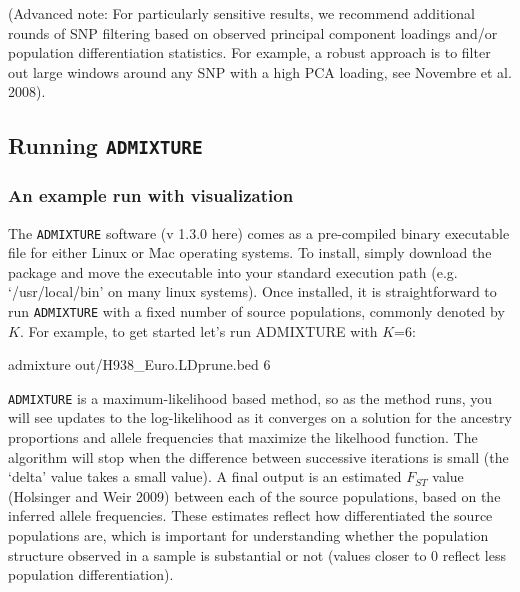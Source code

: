 \documentclass[smallextended]{svjour3}       %
\newenvironment{Shaded}{\begin{snugshade}}{\end{snugshade}}
\newcommand{\ExtensionTok}[1]{#1}
\newcommand{\NormalTok}[1]{#1}
\begin{document}
(Advanced note: For particularly sensitive results, we recommend
additional rounds of SNP filtering based on observed principal component
loadings and/or population differentiation statistics. For example, a
robust approach is to filter out large windows around any SNP with a
high PCA loading, see Novembre et al. 2008).

\subsection{\texorpdfstring{Running
\texttt{ADMIXTURE}}{Running ADMIXTURE}}\label{running-admixture}

\subsubsection{An example run with
visualization}\label{an-example-run-with-visualization}

The \texttt{ADMIXTURE} software (v 1.3.0 here) comes as a pre-compiled
binary executable file for either Linux or Mac operating systems. To
install, simply download the package and move the executable into your
standard execution path (e.g. `/usr/local/bin' on many linux systems).
Once installed, it is straightforward to run \texttt{ADMIXTURE} with a
fixed number of source populations, commonly denoted by \(K\). For
example, to get started let's run ADMIXTURE with \(K\)=6:

\begin{Shaded}
\begin{Highlighting}[]
\ExtensionTok{admixture}\NormalTok{ out/H938_Euro.LDprune.bed 6}
\end{Highlighting}
\end{Shaded}

\texttt{ADMIXTURE} is a maximum-likelihood based method, so as the
method runs, you will see updates to the log-likelihood as it converges
on a solution for the ancestry proportions and allele frequencies that
maximize the likelhood function. The algorithm will stop when the
difference between successive iterations is small (the `delta' value
takes a small value). A final output is an estimated \(F_{ST}\) value
(Holsinger and Weir 2009) between each of the source populations, based
on the inferred allele frequencies. These estimates reflect how
differentiated the source populations are, which is important for
understanding whether the population structure observed in a sample is
substantial or not (values closer to 0 reflect less population
differentiation).
\end{document}
